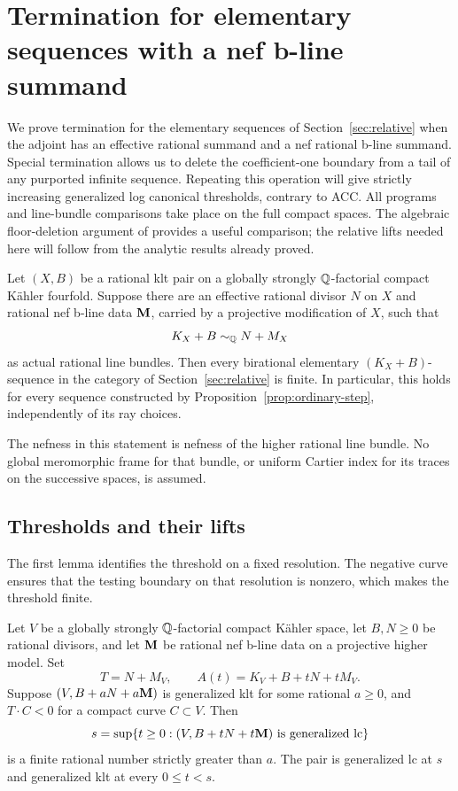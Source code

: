 \section{Termination for elementary sequences with a nef b-line summand}\label{sec:threshold}

We prove termination for the elementary sequences of
Section~\ref{sec:relative} when the adjoint has an effective rational
summand and a nef rational b-line summand. Special termination
allows us to delete the coefficient-one boundary from a tail of any
purported infinite sequence.  Repeating this operation will give strictly
increasing generalized log canonical thresholds, contrary to ACC.
All programs and line-bundle comparisons take place on the full compact
spaces.  The algebraic floor-deletion argument of
\cite[Lemma~2.20 and Theorem~4.1]{CT2023} provides a useful comparison;
the relative lifts needed here will follow from the analytic results already
proved.

\begin{theorem}\label{thm:expression-termination}
Let $(X,B)$ be a rational klt pair on a globally strongly $\mathbb Q$-factorial
compact K\"ahler fourfold.  Suppose there are an effective rational divisor
$N$ on $X$ and rational nef b-line data $\mathbf M$, carried by a projective
modification of $X$, such that
\begin{equation}\label{eq:threshold-expression}
 K_X+B\sim_{\mathbb Q} N+M_X
\end{equation}
as actual rational line bundles.  Then every birational elementary
$(K_X+B)$-sequence in the category of Section~\ref{sec:relative}
is finite.  In particular, this holds for every sequence constructed by
Proposition~\ref{prop:ordinary-step}, independently of its ray choices.
\end{theorem}

The nefness in this statement is nefness of the higher rational line bundle.
No global meromorphic frame for that bundle, or uniform Cartier index for
its traces on the successive spaces, is assumed.

\subsection{Thresholds and their lifts}

The first lemma identifies the threshold on a fixed resolution.  The
negative curve ensures that the testing boundary on that resolution is
nonzero, which makes the threshold finite.

\begin{lemma}\label{lem:rational-threshold}
Let $V$ be a globally strongly $\mathbb Q$-factorial compact K\"ahler space,
let $B,N\geq0$ be rational divisors, and let $\mathbf M$ be rational nef b-line
data on a projective higher model.  Set
\[
 T=N+M_V,\qquad A(t)=K_V+B+tN+tM_V.
\]
Suppose $(V,B+aN+a\mathbf M)$ is generalized klt for some rational $a\geq0$,
and $T\cdot C<0$ for a compact curve $C\subset V$.  Then
\[
 s=\sup\{t\geq0:(V,B+tN+t\mathbf M)\text{ is generalized lc}\}
\]
is a finite rational number strictly greater than $a$.  The pair is
generalized lc at $s$ and generalized klt at every $0\leq t<s$.
\end{lemma}

